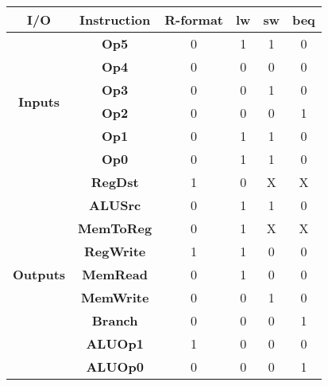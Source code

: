 \begin{multicols}{2}
    \begin{tabular}{|c|c|c|c|c|c|}
    \hline
    \textbf{I/O}                      & \textbf{Instruction} & \textbf{R-format} & \textbf{lw} & \textbf{sw} & \textbf{beq} \\ \hline
    \multirow{6}{*}{\textbf{Inputs}}  & \textbf{Op5}         & 0                 & 1           & 1           & 0            \\ \cline{2-6} 
                                      & \textbf{Op4}         & 0                 & 0           & 0           & 0            \\ \cline{2-6} 
                                      & \textbf{Op3}         & 0                 & 0           & 1           & 0            \\ \cline{2-6} 
                                      & \textbf{Op2}         & 0                 & 0           & 0           & 1            \\ \cline{2-6} 
                                      & \textbf{Op1}         & 0                 & 1           & 1           & 0            \\ \cline{2-6} 
                                      & \textbf{Op0}         & 0                 & 1           & 1           & 0            \\ \hline
    \multirow{9}{*}{\textbf{Outputs}} & \textbf{RegDst}      & 1                 & 0           & X           & X            \\ \cline{2-6} 
                                      & \textbf{ALUSrc}      & 0                 & 1           & 1           & 0            \\ \cline{2-6} 
                                      & \textbf{MemToReg}    & 0                 & 1           & X           & X            \\ \cline{2-6} 
                                      & \textbf{RegWrite}    & 1                 & 1           & 0           & 0            \\ \cline{2-6} 
                                      & \textbf{MemRead}     & 0                 & 1           & 0           & 0            \\ \cline{2-6} 
                                      & \textbf{MemWrite}    & 0                 & 0           & 1           & 0            \\ \cline{2-6} 
                                      & \textbf{Branch}      & 0                 & 0           & 0           & 1            \\ \cline{2-6} 
                                      & \textbf{ALUOp1}      & 1                 & 0           & 0           & 0            \\ \cline{2-6} 
                                      & \textbf{ALUOp0}      & 0                 & 0           & 0           & 1            \\ \hline
    \end{tabular}


\end{multicols}
